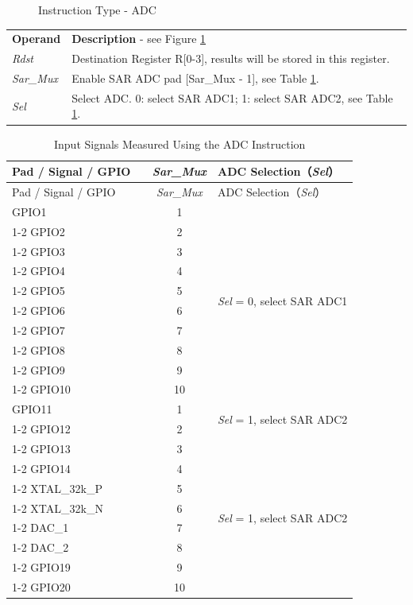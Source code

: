 \documentclass[main\_\_EN.tex]{subfiles}
\begin{document}
%
%
%
%
%
\begin{figure}[!ht ]
    \centering
    \caption{Instruction Type - ADC}
    \label{figure:ADC}
\end{figure}

\begin{tabular}{ l l }
\textbf{Operand} & \textbf{Description} - see Figure \ref{figure:ADC} \\
\textit{Rdst} & Destination Register R[0-3], results will be stored in this register.\\
\textit{Sar\_Mux} & Enable SAR ADC pad [Sar\_Mux - 1], see Table \ref{table:adc inputs1}. \\
\textit{Sel} & Select ADC. 0: select SAR ADC1; 1: select SAR ADC2, see Table \ref{table:adc inputs1}. \\
\end{tabular}

\begin{longtable}{ |p{4cm}|c|p{4cm}| }
    \caption{Input Signals Measured Using the ADC Instruction}
    \label{table:adc inputs1}
    \\\hline
    \rowcolor{lightgray}
    Pad / Signal / GPIO \ & \textit{Sar\_Mux} & ADC Selection（\textit{Sel}） \\\hline
    \endfirsthead
    \hline
    \rowcolor{lightgray}
    Pad / Signal / GPIO \ & \textit{Sar\_Mux} & ADC Selection（\textit{Sel}） \\\hline
    \endhead
    \hline
    \endfoot
    GPIO1    &  1  & \multirow{10}{*}{\textit{Sel} = 0, select SAR ADC1} \\ \cline{1-2}
    GPIO2  &  2  & \\ \cline{ 1-2 }
    GPIO3  &  3  & \\ \cline{1-2}
    GPIO4  &  4  & \\ \cline{1-2}
    GPIO5  &  5  & \\ \cline{1-2}
    GPIO6  &  6  & \\ \cline{1-2}
    GPIO7  &  7  & \\ \cline{1-2}
    GPIO8  &  8  & \\ \cline{1-2}
    GPIO9  &  9  & \\ \cline{1-2}
    GPIO10  &  10  & \\ \hline
    GPIO11    &  1  & \multirow{2}{*}{\textit{Sel} = 1, select SAR ADC2} \\ \cline{1-2}
    GPIO12  &  2  & \\ \cline{1-2}
    GPIO13  &  3  & \multirow{8}{*}{\textit{Sel} = 1, select SAR ADC2}\\ \cline{1-2}
    GPIO14  &  4  & \\ \cline{1-2}
    XTAL\_32k\_P  &  5  & \\ \cline{1-2}
    XTAL\_32k\_N  &  6  & \\ \cline{1-2}
    DAC\_1  &  7  & \\ \cline{1-2}
    DAC\_2  &  8  & \\ \cline{1-2}
    GPIO19  &  9  & \\ \cline{1-2}
    GPIO20                 &  10  &
\end{longtable}
\end{document}

